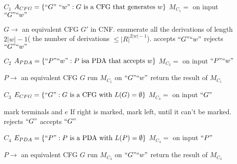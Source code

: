 \begin{enumerate}
    \item [$C_1$] $A_{CFG}=\{ ``G"\ ``w": G\text{ is a CFG that generates }w\}$
    \subitem $M_{C_1}=$ on input $``G"``w"$
    \begin{algorithm}[H]
        \caption{$M_{C_1}$}
        \begin{algorithmic}
            \State $G\to$ an equivalent CFG $G'$ in CNF. 
            \State enumerate all the derivations of length $2|w|-1$( the number of derivations $\le |R|^{2|w|-1}$). 
                \State accepts $``G"``w"$
            \Else
                \State rejects $``G"``w"$
            \EndIf
        \end{algorithmic}
    \end{algorithm}
    \item [$C_2$] $A_{PDA}=\{ ``P"``w": P\text{ isa PDA that accepts }w \}$
    \subitem $M_{C_2}=$ on input $``P"``w"$
    \begin{algorithm}[H]
        \caption{$M_{C_2}$}
        \begin{algorithmic}
            \State $P\to $ an equivalent CFG $G$
            \State run $M_{C_1}$ on $``G"``w"$
            \State return the result of $M_{C_1}$
        \end{algorithmic}
    \end{algorithm}
    \item [$C_3$] $E_{CFG}=\{ ``G": G\text{ is a CFG with }L(G)=\emptyset \}$
    \subitem $M_{C_3}=$ on input $``G"$
    \begin{algorithm}[H]
        \caption{$M_{C_3}$}
        \begin{algorithmic}
            \State mark terminals and $e$
            \State If right is marked, mark left, until it can't be marked. 
                \State rejects $``G"$
            \Else
                \State accepts $``G"$
            \EndIf
        \end{algorithmic}
    \end{algorithm}
    \item [$C_4$] $E_{PDA}=\{ ``P": P\text{ is a PDA with } L(P)=\emptyset \}$
    \subitem $M_{C_4}=$ on input $``P"$
    \begin{algorithm}[H]
        \caption{$M_{C_4}$}
        \begin{algorithmic}
            \State $P\to $ an equivalent CFG $G$
            \State run $M_{C_3}$ on $``G"``w"$
            \State return the result of $M_{C_3}$
        \end{algorithmic}
    \end{algorithm}
\end{enumerate}

